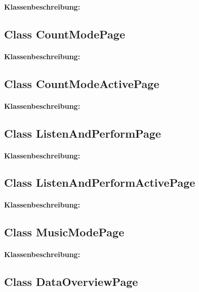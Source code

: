 \documentclass[a4paper,12pt]{article}
\begin{document}
	\paragraph{Klassenbeschreibung:}
	
	\subsection{Class CountModePage}
	\paragraph{Klassenbeschreibung:}

	\subsection{Class CountModeActivePage}
	\paragraph{Klassenbeschreibung:}

	\subsection{Class ListenAndPerformPage}
	\paragraph{Klassenbeschreibung:}

	\subsection{Class ListenAndPerformActivePage}
	\paragraph{Klassenbeschreibung:}
	
	\subsection{Class MusicModePage}
		\paragraph{Klassenbeschreibung:}

	\subsection{Class DataOverviewPage}
\end{document}
